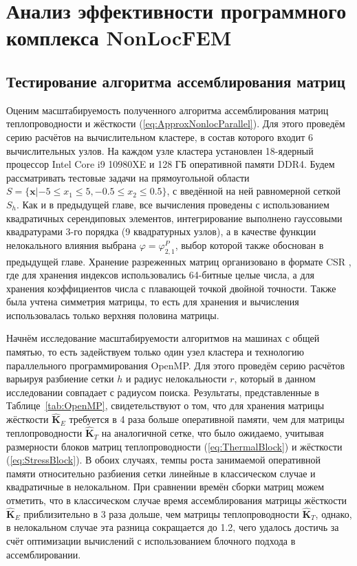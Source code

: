 \chapter{Анализ эффективности программного комплекса NonLocFEM}\label{ch:NonLocFEMAnalysis} 

\section{Тестирование алгоритма ассемблирования матриц}\label{sec:NumericalMethods/AssemblyTest}

Оценим масштабируемость полученного алгоритма ассемблирования матриц теплопроводности и жёсткости (\ref{eq:ApproxNonlocParallel}). Для этого проведём серию расчётов на вычислительном кластере, в состав которого входит 6 вычислительных узлов. На каждом узле кластера установлен 18-ядерный процессор Intel Core i9 10980XE и 128 ГБ оперативной памяти DDR4. Будем рассматривать тестовые задачи на прямоугольной области $S = \{ \boldsymbol{x} | -5 \leqslant x_1 \leqslant 5, -0.5 \leqslant x_2 \leqslant 0.5 \}$, с введённой на ней равномерной сеткой $S_h$. Как и в предыдущей главе, все вычисления проведены с использованием квадратичных серендиповых элементов, интегрирование выполнено гауссовыми квадратурами 3-го порядка (9 квадратурных узлов), а в качестве функции нелокального влияния выбрана $\varphi = \varphi_{2,1}^P$, выбор которой также обоснован в предыдущей главе. Хранение разреженных матриц организовано в формате CSR \cite{Pisanetzkiy}, где для хранения индексов использовались 64-битные целые числа, а для хранения коэффициентов числа с плавающей точкой двойной точности. Также была учтена симметрия матрицы, то есть для хранения и вычисления использовалась только верхняя половина \mbox{матрицы.}

Начнём исследование масштабируемости алгоритмов на машинах с общей памятью, то есть задействуем только один узел кластера и технологию параллельного программирования OpenMP. Для этого проведём серию расчётов варьируя разбиение сетки $h$ и радиус нелокальности $r$, который в данном исследовании совпадает с радиусом поиска. Результаты, представленные в Таблице~\ref{tab:OpenMP}, свидетельствуют о том, что для хранения матрицы жёсткости $\widehat{\textbf{K}}_E$ требуется в 4 раза больше оперативной памяти, чем для матрицы теплопроводности $\widehat{\textbf{K}}_T$ на аналогичной сетке, что было ожидаемо, учитывая размерности блоков матриц теплопроводности (\ref{eq:ThermalBlock}) и жёсткости (\ref{eq:StressBlock}). В обоих случаях, темпы роста занимаемой оперативной памяти относительно разбиения сетки линейные в классическом случае и квадратичные в нелокальном. При сравнении времён сборки матриц можем отметить, что в классическом случае время ассемблирования матрицы жёсткости $\widehat{\textbf{K}}_E$ приблизительно в 3 раза дольше, чем матрицы теплопроводности $\widehat{\textbf{K}}_T$, однако, в нелокальном случае эта разница сокращается до 1.2, чего удалось достичь за счёт оптимизации вычислений с использованием блочного подхода в ассемблировании.

